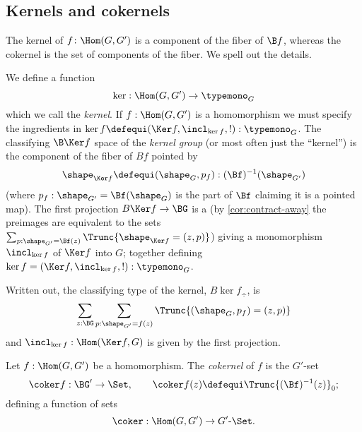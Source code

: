 \subsection{Kernels and cokernels}
The kernel of $f\colon\Hom(G,G')$ is a component of the fiber of $\B f$, whereas the cokernel is the set of components of the fiber.  We spell out the details.
\label{sec:kerandcoker}
\begin{definition}
  \label{def:kernel}
 We define a function
  $$\ker:\Hom(G,G')\to\typemono_G$$
  which we call the \emph{kernel}.
  If $f:\Hom(G,G')$  is a homomorphism we must specify the ingredients in  $\ker f\defequi(\Ker f,\incl_{\ker f},!):\typemono_G$.
  The classifying $\B \Ker f$ space of the \emph{kernel group}
 (or most often just the ``kernel'') is the component of the fiber of $Bf$ pointed by
 $$\shape_{\Ker f}\defequi(\shape_G,p_f):(\Bf)^{-1}(\shape_{G'})$$
  (where $p_f:\shape_{G'}=\Bf(\shape_G)$ is the part of $\Bf$ claiming it is a pointed map).
The first projection $B\Ker f\to \BG$ is a \covering (by \cref{cor:contract-away} the preimages are equivalent to the sets $\sum_{p:\shape_{G'}=\Bf(z)}\Trunc{\shape_{\Ker f}=(z,p)}$) giving a monomorphism
$\incl_{\ker f}$ of $\Ker f$ into $G$; together defining $\ker f=(\Ker f,\incl_{\ker f},!):\typemono_G$.
\end{definition}

Written out, the classifying type of the kernel,
$B\ker f_\div$, is $$\sum_{z:\BG}\sum_{p:\shape_{G'}=f(z)}\Trunc{(\shape_G,p_f)=(z,p)}$$
and $\incl_{\ker f}:\Hom(\Ker f, G)$ is given by the first projection.

\begin{definition}
  \label{def:cokernel}
  Let $f:\Hom(G,G')$  be a homomorphism.
The \emph{cokernel} of $f$ is the $G'$-set
\[
  \coker f:\BG'\to\Set,\qquad \coker f(z)\defequi  \Trunc{(\Bf)^{-1}(z)}_0;
\]
defining a function of sets
$$\coker:\Hom(G,G')\to G'\text{-}\Set.$$
\end{definition}

